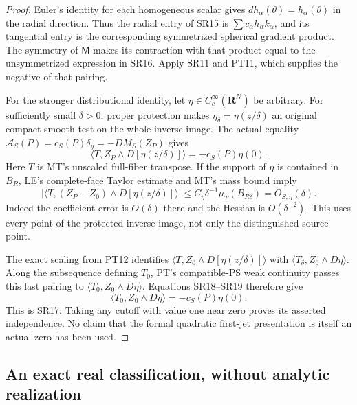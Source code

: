 \begin{proof}
Euler's identity for each homogeneous scalar gives
$d h_\alpha(\theta)=h_\alpha(\theta)$ in the radial
direction.  Thus the radial entry of SR15 is
$\sum c_\alpha h_\alpha k_\alpha$, and its tangential
entry is the corresponding symmetrized spherical gradient
product.  The symmetry of $\mathsf M$ makes its contraction
with that product equal to the unsymmetrized expression
in SR16.  Apply SR11 and PT11, which supplies the negative
of that pairing.

For the stronger distributional identity, let
$\eta\in C_c^\infty(\mathbf R^N)$ be arbitrary.  For
sufficiently small $\delta>0$, proper protection makes
$\eta_\delta=\eta(z/\delta)$ an original compact smooth
test on the whole inverse image.  The actual equality
$\mathcal A_S(P)=c_S(P)\delta_y=-D M_S(Z_P)$ gives
\[
       \langle T,Z_P\wedge D[\eta(z/\delta)]\rangle
                              =-c_S(P)\eta(0).
 \tag{SR18}
\]
Here $T$ is MT's unscaled full-fiber transpose.  If the
support of $\eta$ is contained in $B_R$, LE's complete-face
Taylor estimate and MT's mass bound imply
\[
 \left|\langle T,(Z_P-Z_0)\wedge D[\eta(z/\delta)]\rangle\right|
       \le C_\eta\delta^{-1}\mu_T(B_{R\delta})
                               =O_{S,\eta}(\delta).
 \tag{SR19}
\]
Indeed the coefficient error is $O(\delta)$ there and
the Hessian is $O(\delta^{-2})$.  This uses every point
of the protected inverse image, not only the distinguished
source point.

The exact scaling from PT12 identifies
$\langle T,Z_0\wedge D[\eta(z/\delta)]\rangle$ with
$\langle T_\delta,Z_0\wedge D\eta\rangle$.
Along the subsequence defining $T_0$, PT's compatible-PS
weak continuity passes this last pairing to
$\langle T_0,Z_0\wedge D\eta\rangle$.
Equations SR18--SR19 therefore give
\[
             \langle T_0,Z_0\wedge D\eta\rangle
                                     =-c_S(P)\eta(0).
\]
This is SR17.  Taking any cutoff with value one near zero
proves its asserted independence.  No claim that the formal
quadratic first-jet presentation is itself an actual zero
has been used.
\end{proof}

\subsection{An exact real classification, without analytic realization}

